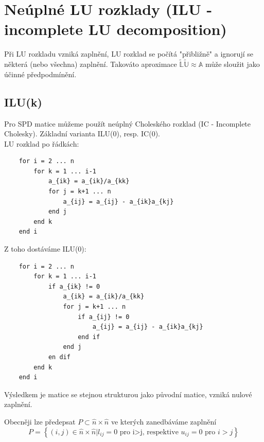 \documentclass[../main.tex]{subfiles}
\begin{document}
\section{Neúplné LU rozklady (ILU - incomplete LU decomposition)}

Při LU rozkladu vzniká zaplnění, LU rozklad se počítá "přibližně" a ignorují se některá (nebo všechna)
zaplnění. Takováto aproximace $\tilde{\mathbb{L}}\tilde{\mathbb{U}}\approx \mathbb{A}$ může sloužit jako účinné předpodmínění.

\subsection{ILU(k)}

Pro SPD matice můžeme použít neúplný Choleského rozklad (IC - Incomplete Cholesky). Základní varianta ILU(0), resp. IC(0).\\
LU rozklad po řádkách:

\begin{minipage}{0.95\linewidth}
    \begin{verbatim}
    for i = 2 ... n 
        for k = 1 ... i-1
            a_{ik} = a_{ik}/a_{kk}
            for j = k+1 ... n
                a_{ij} = a_{ij} - a_{ik}a_{kj}
            end j 
        end k 
    end i
    \end{verbatim}    
\end{minipage}


Z toho dostáváme ILU(0):

\begin{minipage}{0.95\linewidth}
    \begin{verbatim}
    for i = 2 ... n 
        for k = 1 ... i-1
            if a_{ik} != 0
                a_{ik} = a_{ik}/a_{kk}
                for j = k+1 ... n
                    if a_{ij} != 0
                        a_{ij} = a_{ij} - a_{ik}a_{kj}
                    end if
                end j
            en dif  
        end k 
    end i
    \end{verbatim}    
\end{minipage}

Výsledkem je matice  se stejnou strukturou jako původní matice, vzniká nulové zaplnění.


Obecněji lze předepsat $P \subset \hat{n} \times \hat{n}$ ve kterých zanedbáváme zaplnění
\begin{equation*}
    P = \left\{ (i,j) \in \hat{n} \times \hat{n} | l_{ij} = 0\text{ pro i>j, respektive }u_{ij} = 0 \text{ pro } i>j  \right\}
\end{equation*}
\end{document}
